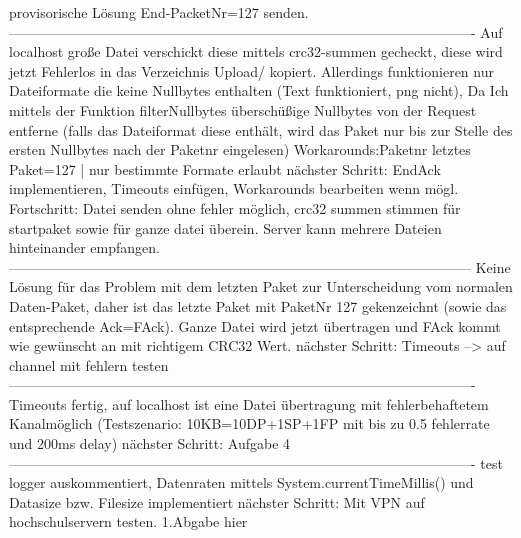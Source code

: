 \documentclass {article}[a4paper,12pt]
\begin{document}
provisorische Lösung End-PacketNr=127 senden.
\newline
----------------------------------------------------------------------------------------------------
\newline
Auf localhost große Datei verschickt diese mittels crc32-summen gecheckt, diese wird jetzt
Fehlerlos in das Verzeichnis Upload/ kopiert.
Allerdings funktionieren nur Dateiformate die keine Nullbytes enthalten (Text funktioniert, png nicht),
Da Ich mittels der Funktion filterNullbytes überschüßige Nullbytes von der Request entferne (falls das Dateiformat diese enthält, wird das Paket nur bis zur Stelle des ersten Nullbytes nach der Paketnr eingelesen)
\newline
Workarounds:Paketnr letztes Paket=127 | nur bestimmte Formate erlaubt
\newline
nächster Schritt: EndAck implementieren, Timeouts einfügen, Workarounds bearbeiten wenn mögl.
\newline
Fortschritt: Datei senden ohne fehler möglich, crc32 summen stimmen für  startpaket sowie für ganze datei überein.
Server kann mehrere Dateien hinteinander empfangen.
\newline
---------------------------------------------------------------------------------------------------
\newline
Keine Lösung für das Problem mit dem letzten Paket zur Unterscheidung  vom normalen Daten-Paket,
daher ist das letzte Paket mit PaketNr 127 gekenzeichnt (sowie das entsprechende Ack=FAck).
Ganze Datei wird  jetzt übertragen und FAck kommt wie gewünscht an mit richtigem CRC32 Wert.
\newline
nächster Schritt: Timeouts --> auf channel mit fehlern testen
\newline
----------------------------------------------------------------------------------------------------
\newline
Timeouts fertig, auf localhost ist eine Datei übertragung mit fehlerbehaftetem Kanalmöglich (Testszenario: 10KB=10DP+1SP+1FP mit bis zu 0.5 fehlerrate und 200ms delay)
\newline
nächster Schritt: Aufgabe 4
\newline
----------------------------------------------------------------------------------------------------
\newline
test logger auskommentiert, Datenraten mittels System.currentTimeMillis() und Datasize bzw. Filesize implementiert
\newline
nächster Schritt: Mit VPN auf hochschulservern testen.
\newline
1.Abgabe hier
\end{document}
